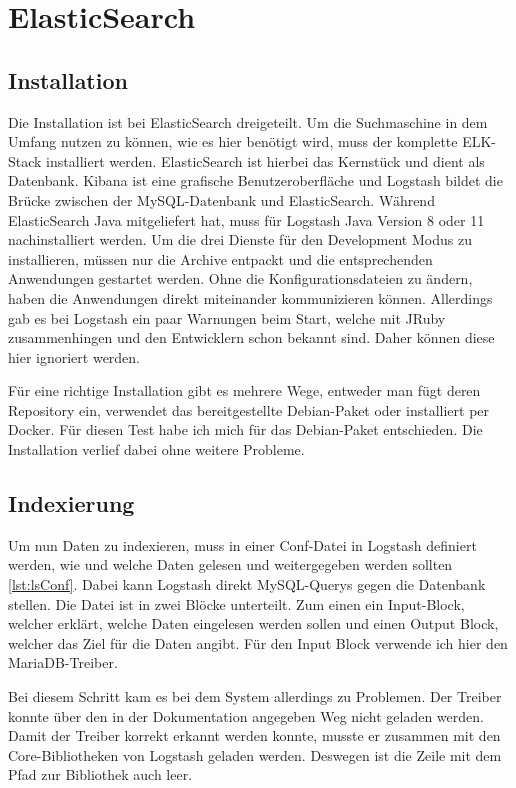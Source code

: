 
\section{ElasticSearch}

\subsection{Installation}

Die Installation ist bei ElasticSearch dreigeteilt. Um die Suchmaschine in dem Umfang nutzen zu können, wie es hier benötigt wird, muss der komplette ELK-Stack installiert werden. ElasticSearch ist hierbei das Kernstück und dient als Datenbank. Kibana ist eine grafische Benutzeroberfläche und Logstash bildet die Brücke zwischen der MySQL-Datenbank und ElasticSearch. Während ElasticSearch Java mitgeliefert hat, muss für Logstash Java Version 8 oder 11 nachinstalliert werden. Um die drei Dienste für den Development Modus zu installieren, müssen nur die Archive entpackt und die entsprechenden Anwendungen gestartet werden. Ohne die Konfigurationsdateien zu ändern, haben die Anwendungen direkt miteinander kommunizieren können. Allerdings gab es bei Logstash ein paar Warnungen beim Start, welche mit JRuby zusammenhingen und den Entwicklern schon bekannt sind. Daher können diese hier ignoriert werden.

Für eine richtige Installation gibt es mehrere Wege, entweder man fügt deren Repository ein, verwendet das bereitgestellte Debian-Paket oder installiert per Docker. Für diesen Test habe ich mich für das Debian-Paket entschieden. Die Installation verlief dabei ohne weitere Probleme.

\subsection{Indexierung}
\label{elaVgl:index}

Um nun Daten zu indexieren, muss in einer Conf-Datei in Logstash definiert werden, wie und welche Daten gelesen und weitergegeben werden sollten \ref{lst:lsConf}. Dabei kann Logstash direkt MySQL-Querys gegen die Datenbank stellen. Die Datei ist in zwei Blöcke unterteilt. Zum einen ein Input-Block, welcher erklärt, welche Daten eingelesen werden sollen und einen Output Block, welcher das Ziel für die Daten angibt. Für den Input Block verwende ich hier den MariaDB-Treiber.

Bei diesem Schritt kam es bei dem System allerdings zu Problemen. Der Treiber konnte über den in der Dokumentation angegeben Weg nicht geladen werden.  Damit der Treiber korrekt erkannt werden konnte, musste er zusammen mit den Core-Bibliotheken von Logstash geladen werden. Deswegen ist die Zeile mit dem Pfad zur Bibliothek auch leer. 

